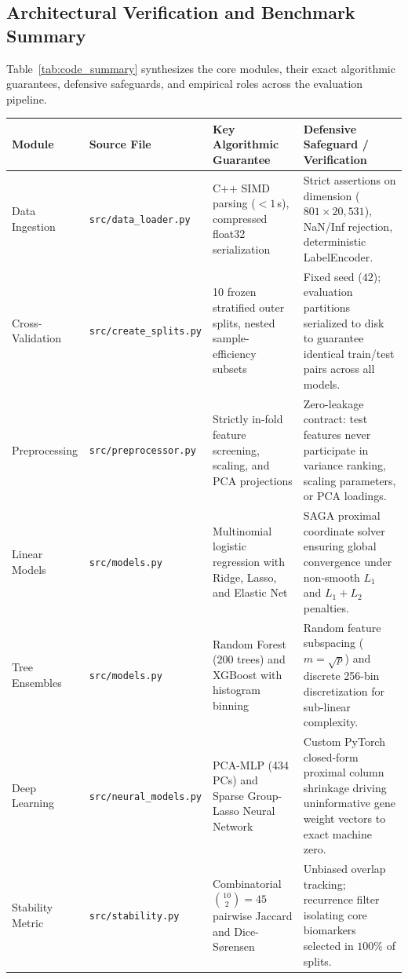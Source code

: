 \documentclass[10pt,a4paper]{article}
\begin{document}
\subsection{Architectural Verification and Benchmark Summary}
Table~\ref{tab:code_summary} synthesizes the core modules, their exact algorithmic guarantees, defensive safeguards, and empirical roles across the evaluation pipeline.

\vspace{0.15cm}
\noindent
\begin{minipage}{\linewidth}
\centering
\footnotesize
\renewcommand{\arraystretch}{1.12}
\begin{tabular}{p{2.4cm} p{3.2cm} p{5.0cm} p{4.8cm}}
\toprule
\textbf{Module} & \textbf{Source File} & \textbf{Key Algorithmic Guarantee} & \textbf{Defensive Safeguard / Verification} \\
\midrule
Data Ingestion & \texttt{src/data\_loader.py} & C++ SIMD parsing ($< 1$\,s), compressed float32 serialization & Strict assertions on dimension ($801 \times 20{,}531$), NaN/Inf rejection, deterministic LabelEncoder. \\
Cross-Validation & \texttt{src/create\_splits.py} & 10 frozen stratified outer splits, nested sample-efficiency subsets & Fixed seed ($42$); evaluation partitions serialized to disk to guarantee identical train/test pairs across all models. \\
Preprocessing & \texttt{src/preprocessor.py} & Strictly in-fold feature screening, scaling, and PCA projections & Zero-leakage contract: test features never participate in variance ranking, scaling parameters, or PCA loadings. \\
Linear Models & \texttt{src/models.py} & Multinomial logistic regression with Ridge, Lasso, and Elastic Net & SAGA proximal coordinate solver ensuring global convergence under non-smooth $L_1$ and $L_1+L_2$ penalties. \\
Tree Ensembles & \texttt{src/models.py} & Random Forest ($200$ trees) and XGBoost with histogram binning & Random feature subspacing ($m = \sqrt{p}$) and discrete 256-bin discretization for sub-linear complexity. \\
Deep Learning & \texttt{src/neural\_models.py} & PCA-MLP (434 PCs) and Sparse Group-Lasso Neural Network & Custom PyTorch closed-form proximal column shrinkage driving uninformative gene weight vectors to exact machine zero. \\
Stability Metric & \texttt{src/stability.py} & Combinatorial $\binom{10}{2} = 45$ pairwise Jaccard and Dice-S\o{}rensen & Unbiased overlap tracking; recurrence filter isolating core biomarkers selected in $100\%$ of splits. \\

\end{tabular}
\end{minipage}
\end{document}
